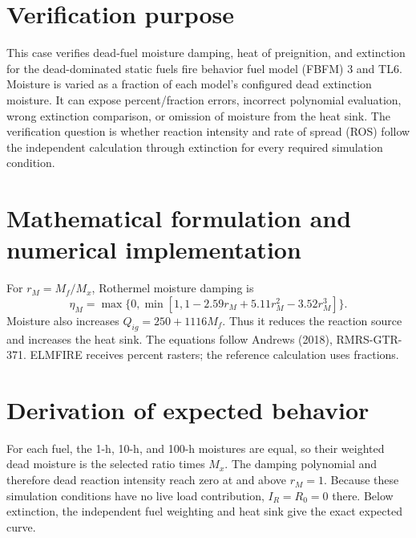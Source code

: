 \section{Verification purpose}

This case verifies dead-fuel moisture damping, heat of preignition, and extinction for the dead-dominated static fuels fire behavior fuel model (FBFM) 3 and TL6.  Moisture is varied as a fraction of each model's configured dead extinction moisture.  It can expose percent/fraction errors, incorrect polynomial evaluation, wrong extinction comparison, or omission of moisture from the heat sink.  The verification question is whether reaction intensity and rate of spread (ROS) follow the independent calculation through extinction for every required simulation condition.

\section{Mathematical formulation and numerical implementation}
For $r_M=M_f/M_x$, Rothermel moisture damping is
\begin{equation}\eta_M=\max\{0,\min[1,1-2.59r_M+5.11r_M^2-3.52r_M^3]\}.\end{equation}
Moisture also increases $Q_{ig}=250+1116M_f$.  Thus it reduces the reaction source and increases the heat sink.  The equations follow Andrews (2018), RMRS-GTR-371.  ELMFIRE receives percent rasters; the reference calculation uses fractions.

\section{Derivation of expected behavior}
For each fuel, the 1-h, 10-h, and 100-h moistures are equal, so their weighted dead moisture is the selected ratio times $M_x$.  The damping polynomial and therefore dead reaction intensity reach zero at and above $r_M=1$.  Because these simulation conditions have no live load contribution, $I_R=R_0=0$ there.  Below extinction, the independent fuel weighting and heat sink give the exact expected curve.

